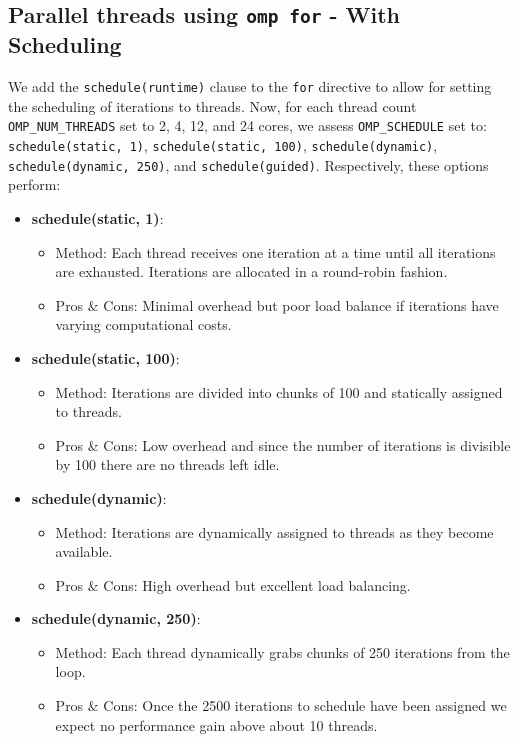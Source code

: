 \documentclass{article}
\begin{document}
\subsection{Parallel threads using \texttt{omp for} - With Scheduling}
We add the \texttt{schedule(runtime)} clause to the \texttt{for} directive to allow 
for setting the scheduling of iterations to threads. 
Now, for each thread count \texttt{OMP\_NUM\_THREADS} set to 2, 4, 12, and 24 cores, we assess \texttt{OMP\_SCHEDULE} set to: 
\texttt{schedule(static, 1)}, \texttt{schedule(static, 100)}, \texttt{schedule(dynamic)}, \texttt{schedule(dynamic, 250)}, and \texttt{schedule(guided)}. Respectively, 
these options perform:
\begin{itemize}

\item \textbf{schedule(static, 1)}:
  \begin{itemize}
    \item Method: Each thread receives one iteration at a time until all iterations are exhausted. Iterations are allocated in a round-robin fashion.
    \item Pros \& Cons: Minimal overhead but poor load balance if iterations have varying computational costs.
  \end{itemize}

\item \textbf{schedule(static, 100)}:
  \begin{itemize}
    \item Method: Iterations are divided into chunks of 100 and statically assigned to threads.
    \item Pros \& Cons: Low overhead and since the number of iterations is divisible by 100 there are no threads left idle.
  \end{itemize}

\item \textbf{schedule(dynamic)}:
  \begin{itemize}
    \item Method: Iterations are dynamically assigned to threads as they become available.
    \item Pros \& Cons: High overhead but excellent load balancing.
  \end{itemize}

\item \textbf{schedule(dynamic, 250)}:
  \begin{itemize}
    \item Method: Each thread dynamically grabs chunks of 250 iterations from the loop.
    \item Pros \& Cons: Once the 2500 iterations to schedule have been assigned we expect no performance gain above about 10 threads.
  \end{itemize}


\end{itemize}
\end{document}
